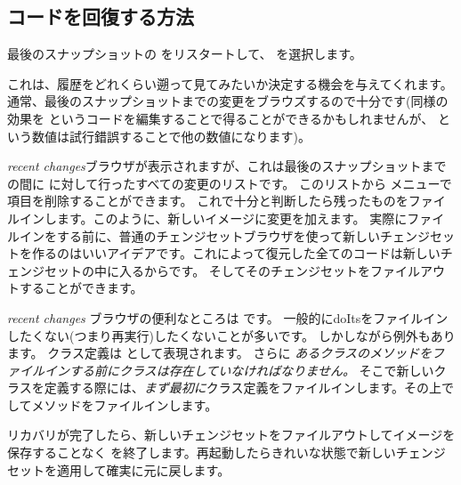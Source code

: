 \documentclass[a4paper,10pt,twoside]{book}
\begin{document}
\subsection{コードを回復する方法}
最後のスナップショットの \pharo をリスタートして、  を選択します。




これは、履歴をどれくらい遡って見てみたいか決定する機会を与えてくれます。
通常、最後のスナップショットまでの変更をブラウズするので十分です(同様の効果を  というコードを編集することで得ることができるかもしれませんが、  という数値は試行錯誤することで他の数値になります)。

\emph{recent changes}ブラウザが表示されますが、これは最後のスナップショットまでの間に \pharo に対して行ったすべての変更のリストです。
このリストから \actclick メニューで項目を削除することができます。
これで十分と判断したら残ったものをファイルインします。このように、新しいイメージに変更を加えます。
実際にファイルインをする前に、普通のチェンジセットブラウザを使って新しいチェンジセットを作るのはいいアイデアです。これによって復元した全てのコードは新しいチェンジセットの中に入るからです。
そしてそのチェンジセットをファイルアウトすることができます。

\emph{recent changes} ブラウザの便利なところは  です。
一般的にdoItsをファイルインしたくない(つまり再実行)したくないことが多いです。
しかしながら例外もあります。
クラス定義は  として表現されます。
さらに \emph{あるクラスのメソッドをファイルインする前にクラスは存在していなければなりません。}
そこで新しいクラスを定義する際には、\emph{まず最初に}クラス定義をファイルインします。その上で  してメソッドをファイルインします。

リカバリが完了したら、新しいチェンジセットをファイルアウトしてイメージを保存することなく \pharo を終了します。再起動したらきれいな状態で新しいチェンジセットを適用して確実に元に戻します。
\end{document}
